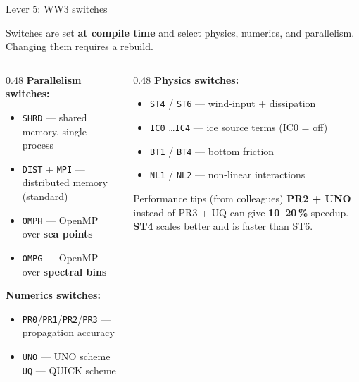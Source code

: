 \documentclass[aspectratio=169,10pt]{beamer}
\begin{document}
\begin{frame}[shrink=12]{Lever 5: WW3 switches}

  Switches are set \textbf{at compile time} and select physics, numerics,
  and parallelism.  Changing them requires a rebuild.

  \vspace{0.2em}
  \begin{columns}[T]
    \begin{column}{0.48\textwidth}
      \textbf{Parallelism switches:}
      \begin{itemize}
        \item \texttt{SHRD} --- shared memory, single process
        \item \texttt{DIST} + \texttt{MPI} --- distributed memory (standard)
        \item \texttt{OMPH} --- OpenMP over \textbf{sea points}
        \item \texttt{OMPG} --- OpenMP over \textbf{spectral bins}
      \end{itemize}

      \vspace{0.2em}
      \textbf{Numerics switches:}
      \begin{itemize}
        \item \texttt{PR0}/\texttt{PR1}/\texttt{PR2}/\texttt{PR3} ---
              propagation accuracy
        \item \texttt{UNO} --- UNO scheme \quad \texttt{UQ} --- QUICK scheme
      \end{itemize}
    \end{column}
    \begin{column}{0.48\textwidth}
      \textbf{Physics switches:}
      \begin{itemize}
        \item \texttt{ST4} / \texttt{ST6} --- wind-input + dissipation
        \item \texttt{IC0} \ldots \texttt{IC4} ---
              ice source terms (IC0 = off)
        \item \texttt{BT1} / \texttt{BT4} --- bottom friction
        \item \texttt{NL1} / \texttt{NL2} --- non-linear interactions
      \end{itemize}

      \vspace{0.3em}
      \begin{exampleblock}{Performance tips (from colleagues)}
        \small
        \textbf{PR2 + UNO} instead of PR3 + UQ can give \textbf{10--20\,\%} speedup.\\
        \textbf{ST4} scales better and is faster than ST6.
      \end{exampleblock}
    \end{column}
  \end{columns}
\end{frame}
\end{document}
